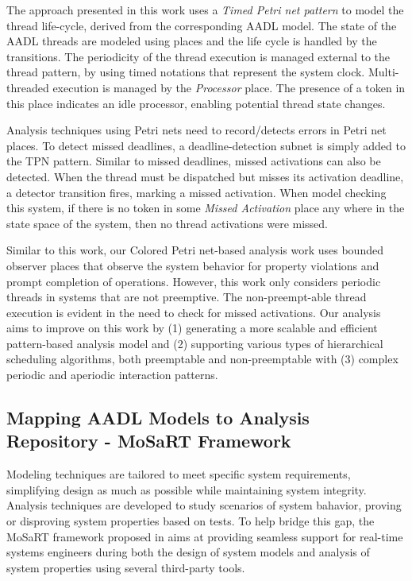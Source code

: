 The approach presented in this work uses a \emph{Timed Petri net pattern} to model the thread life-cycle, derived from the corresponding AADL model. The state of the AADL threads are modeled using places and the life cycle is handled by the transitions. The periodicity of the thread execution is managed external to the thread pattern, by using timed notations that represent the system clock. Multi-threaded execution is managed by the \emph{Processor} place. The presence of a token in this place indicates an idle processor, enabling potential thread state changes. 

Analysis techniques using Petri nets need to record/detects errors in Petri net places. To detect missed deadlines, a deadline-detection subnet is simply added to the TPN pattern. Similar to missed deadlines, missed activations can also be detected. When the thread must be dispatched but misses its activation deadline, a detector transition fires, marking a missed activation. When model checking this system, if there is no token in some \emph{Missed Activation} place any where in the state space of the system, then no thread activations were missed. 

Similar to this work, our Colored Petri net-based analysis work uses bounded observer places \cite{Alpern1989} that observe the system behavior for property violations and prompt completion of operations. However, this work \cite{kordon2009} only considers periodic threads in systems that are not preemptive. The non-preempt-able thread execution is evident in the need to check for missed activations. Our analysis aims to improve on this work by (1) generating a more scalable and efficient pattern-based analysis model and (2) supporting various types of hierarchical scheduling algorithms, both preemptable and non-preemptable with (3) complex periodic and aperiodic interaction patterns.


\subsection{Mapping AADL Models to Analysis Repository - MoSaRT Framework}

Modeling techniques are tailored to meet specific system requirements, simplifying design as much as possible while maintaining system integrity. Analysis techniques are developed to study scenarios of system bahavior, proving or disproving system properties based on tests. To help bridge this gap, the MoSaRT framework proposed in \cite{Yassine2013} aims at providing seamless support for real-time systems engineers during both the design of system models and analysis of system properties using several third-party tools. 

